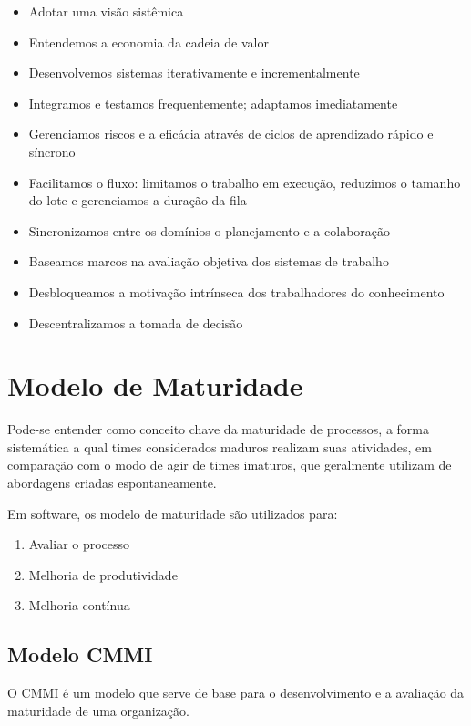 \begin{itemize}
  \item Adotar uma visão sistêmica
  \item Entendemos a economia da cadeia de valor
  \item Desenvolvemos sistemas iterativamente e incrementalmente
  \item Integramos e testamos frequentemente; adaptamos imediatamente
  \item Gerenciamos riscos e a eficácia através de ciclos de aprendizado rápido e síncrono
  \item Facilitamos o fluxo: limitamos o trabalho em execução, reduzimos o tamanho
  do lote e gerenciamos a duração da fila
  \item Sincronizamos entre os domínios o planejamento e a colaboração
  \item Baseamos marcos na avaliação objetiva dos sistemas de trabalho
  \item Desbloqueamos a motivação intrínseca dos trabalhadores do conhecimento
  \item Descentralizamos a tomada de decisão
\end{itemize}


\section{Modelo de Maturidade}

Pode-se entender como conceito chave da maturidade de processos, a forma sistemática
a qual times considerados maduros realizam suas atividades, em comparação com o modo
de agir de times imaturos, que geralmente utilizam de abordagens criadas espontaneamente.

Em software, os modelo de maturidade são utilizados para:

\begin{enumerate}
  \item Avaliar o processo
  \item Melhoria de produtividade
  \item Melhoria contínua
\end{enumerate}

\subsection{Modelo CMMI}

O CMMI é um modelo que serve de base para o desenvolvimento e a avaliação da maturidade de uma organização.


